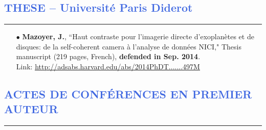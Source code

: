 \documentclass[11pt,a4paper, french]{article}
\begin{document}
\vspace{-0.3cm}
\textcolor{RoyalBlue}{\section{\large THESE -- Universit\'e Paris Diderot}
\vspace{-0.2cm}\hrule}
\vspace{0.4cm}

\begin{itemize}
\item[$\bullet$] \textbf{Mazoyer, J.}, “Haut contraste pour l'imagerie directe d'exoplanètes et de disques: de la self-coherent camera à l'analyse de données NICI," Thesis manuscript (219 pages, French), \textbf{defended in Sep. 2014}. \\
Link: \textcolor{BrickRed}{\underline{\url{http://adsabs.harvard.edu/abs/2014PhDT.......497M}}}
\end{itemize}


\vspace{-0.3cm}
\textcolor{RoyalBlue}{\section{\large ACTES DE CONFÉRENCES EN PREMIER AUTEUR}
\vspace{-0.2cm}\hrule}
\vspace{0.4cm}
\end{document}
